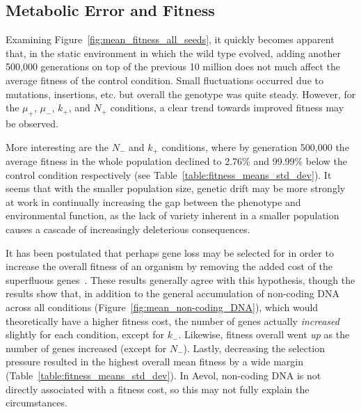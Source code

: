 \subsection{Metabolic Error and Fitness}
Examining Figure~\ref{fig:mean_fitness_all_seeds}, it quickly becomes apparent that, in the static environment in which the wild type evolved, adding another 500,000 generations on top of the previous 10 million does not much affect the average fitness of the control condition. Small fluctuations occurred due to mutations, insertions, etc. but overall the genotype was quite steady. However, for the $\mu_+$, $\mu_-$, $k_+$, and $N_+$ conditions, a clear trend towards improved fitness may be observed.

More interesting are the $N_-$ and $k_+$ conditions, where by generation 500,000 the average fitness in the whole population declined to 2.76\% and 99.99\% below the control condition respectively (see Table~\ref{table:fitness_means_std_dev}). It seems that with the smaller population size, genetic drift may be more strongly at work in continually increasing the gap between the phenotype and environmental function, as the lack of variety inherent in a smaller population causes a cascade of increasingly deleterious consequences.
 
It has been postulated that perhaps gene loss may be selected for in order to increase the overall fitness of an organism by removing the added cost of the superfluous genes~\cite{koskiniemi2012}. These results generally agree with this hypothesis, though the results show that, in addition to the general accumulation of non-coding DNA across all conditions (Figure~\ref{fig:mean_non-coding_DNA}), which would theoretically have a higher fitness cost, the number of genes actually \textit{increased} slightly for each condition, except for $k_-$. Likewise, fitness overall went \textit{up} as the number of genes increased (except for $N_-$). Lastly, decreasing the selection pressure resulted in the highest overall mean fitness by a wide margin (Table~\ref{table:fitness_means_std_dev}). In Aevol, non-coding DNA is not directly associated with a fitness cost, so this may not fully explain the circumstances.  


